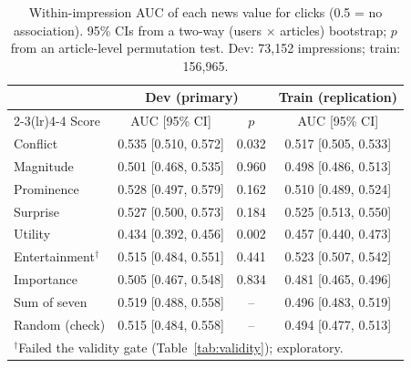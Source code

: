 \begin{table}[t]
\centering
\caption{Within-impression AUC of each news value for clicks (0.5 = no association). 95\% CIs from a two-way (users $\times$ articles) bootstrap; $p$ from an article-level permutation test. Dev: 73,152 impressions; train: 156,965.}
\label{tab:auc}
\setlength{\tabcolsep}{3pt}
\begin{tabular}{lccc}
\toprule
 & \multicolumn{2}{c}{Dev (primary)} & Train (replication) \\
\cmidrule(lr){2-3}\cmidrule(lr){4-4}
Score & AUC [95\% CI] & $p$ & AUC [95\% CI] \\
\midrule
Conflict        & 0.535 [0.510, 0.572] & 0.032 & 0.517 [0.505, 0.533] \\
Magnitude       & 0.501 [0.468, 0.535] & 0.960 & 0.498 [0.486, 0.513] \\
Prominence      & 0.528 [0.497, 0.579] & 0.162 & 0.510 [0.489, 0.524] \\
Surprise        & 0.527 [0.500, 0.573] & 0.184 & 0.525 [0.513, 0.550] \\
Utility         & 0.434 [0.392, 0.456] & 0.002 & 0.457 [0.440, 0.473] \\
Entertainment$^\dagger$ & 0.515 [0.484, 0.551] & 0.441 & 0.523 [0.507, 0.542] \\
Importance      & 0.505 [0.467, 0.548] & 0.834 & 0.481 [0.465, 0.496] \\
\midrule
Sum of seven    & 0.519 [0.488, 0.558] & -- & 0.496 [0.483, 0.519] \\
Random (check)  & 0.515 [0.484, 0.558] & -- & 0.494 [0.477, 0.513] \\
\bottomrule
\multicolumn{4}{l}{\footnotesize $^\dagger$Failed the validity gate (Table~\ref{tab:validity}); exploratory.}
\end{tabular}
\end{table}
